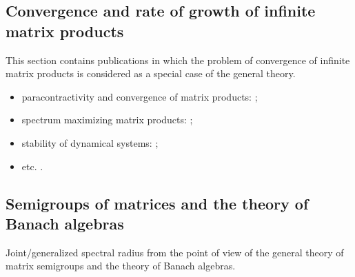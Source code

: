 \documentclass[a4paper,fleqn]{article}
\let\cite=\citep
\begin{document}
\subsection*{Convergence and rate of growth of infinite matrix products}
This section contains publications in which the problem of convergence of infinite matrix products is considered as a special case of the general theory.

\begin{itemize}
\item paracontractivity and convergence of matrix products: \cite{BeynEls96, BE:EJLA97, NeuSch:ArXiv98, VEB:LAA00, Mojskerc:LAA14, WangCheng:LMA16};
\item spectrum maximizing matrix products:  \cite{BochiLas:SAIMJMAA24, CGSZ:LAA10, JSRpack, GugProt:SIAMJMAA16, GugZen:LAA08, Koz:ArXiv24, Laskawiec:ArXiv24, Vladimirov:ArXiv24};
\item stability of dynamical systems: \cite{Ahmadi08, AhmPar:CDC05, Bar:CDC05, BrayTong:TCS79, BrayTong:TCS80, GugZen:LNM14, Koz:AiT90:10:e, AKKK:92:e, ShihWP:LAA97, SBKK:CDC97, Shih:LAA99, KasBh:2000, BTV:MTNS02};
\item etc. \cite{AndoShih:SIAM:98, BerWang:LAA92, BEN:ETNA94, CiconePhD11, Cohen:MPCPS79, DaubLag:LAA92, DaubLag:LAA01, EF:LAA97, FLS:ETDS19, GugZen:LAA01, GurRod:SIAMJMAA97, GugZen:LAA03, Hajnal:MPCPS76, Hartfiel02, Holtz:EJLA00, HR:APM12, Koz:DDNS18, Koz:ArXiv20, Mate:PAMS98, Mate:FM99, NSch:LAA99, PJ:LAA13, Shen:LAA00, ShihPang:AJIFAC08, SU:SIAMJMAA94, Thomas:Arxiv18, Thomas:ArXiv22, Vlad:ArXiv16}.
\end{itemize}

\subsection*{Semigroups of matrices and the theory of Banach algebras}
Joint/generalized spectral radius from the point of view of the general theory of matrix semigroups and the theory of Banach algebras.
\end{document}
